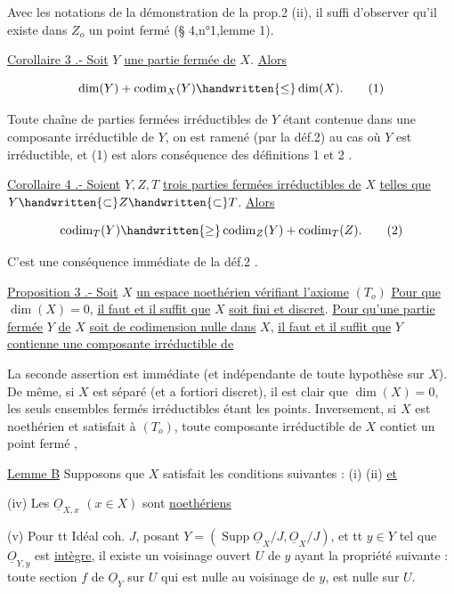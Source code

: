 Avec les notations de la démonstration de la prop.2 (ii), il suffi d'observer qu'il existe dans $Z_o$ un point fermé (\S{} 4,n°1,lemme 1).

\uline{Corollaire 3 .- Soit} $Y$ \uline{une partie fermée de} $X$. \uline{Alors}

\[
 \dim(Y)+\operatorname{codim}_X(Y)\handwritten{\leq}\dim(X).\tag*{(1)}
\]

Toute chaîne de parties fermées irréductibles de $Y$ étant contenue dans une composante irréductible de $Y$, on est ramené (par la déf.2) au cas où $Y$ est irréductible, et (1) est alors conséquence des définitions 1 et 2 .

\uline{Corollaire 4 .- Soient} $Y,Z,T$ \uline{trois parties fermées irréductibles de} $X$ \uline{telles que} $Y\handwritten{\subset}Z\handwritten{\subset}T$. \uline{Alors}

\[
 \operatorname{codim}_T(Y)\handwritten{\geq}\operatorname{codim}_Z(Y)+\operatorname{codim}_T(Z).\tag*{(2)}
\]

C'est une conséquence immédiate de la déf.2 .

\uline{Proposition 3 .- Soit} $X$ \uline{un espace noethérien vérifiant l'axiome} $(T_o)$ \uline{Pour que} $\dim(X)=0$, \uline{il faut et il suffit que} $X$ \uline{soit fini et discret}. \uline{Pour qu'une partie fermée} $Y$ \uline{de} $X$ \uline{soit de codimension nulle dans} $X$, \uline{il faut et il suffit que} $Y$ \uline{contienne une composante irréductible de}

La seconde assertion est immédiate (et indépendante de toute hypothèse sur $X$). De même, si $X$ est séparé (et a fortiori discret), il est clair que $\dim(X)=0$, les seuls ensembles fermés irréductibles étant les points. Inversement, si $X$ est noethérien et satisfait à $(T_o)$, toute composante irréductible de $X$ contiet un point fermé ,

 \uline{Lemme B} Supposons  que $X$ satisfait les conditions suivantes : (i) (ii) \uline{et}

(iv) Les $\underline O_{X,x}$ $(x\in X)$ sont \uline{noethériens}

(v) Pour tt  Idéal coh. $J$,  posant $Y=(\operatorname{Supp}\underline O_X/J,\underline O_X/J)$, et tt $y\in Y$ tel que $\underline O_{Y,y}$ est \uline{intègre}, il existe un voisinage ouvert $U$ de $y$  ayant la propriété suivante : toute section $f$ de $\underline O_Y$ sur  $U$ qui est  nulle au voisinage de $y$, est nulle sur $U$.

